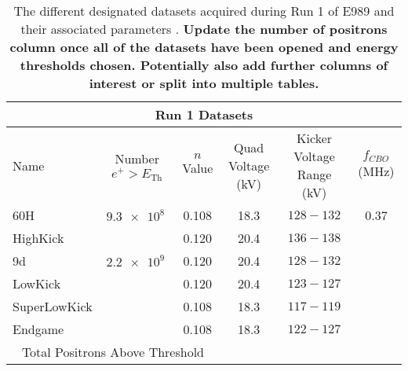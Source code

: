 \begin{landscape}
\begin{table}[]
\centering
\setlength\tabcolsep{10pt}
\renewcommand{\arraystretch}{1.2}
\begin{tabular*}{1\linewidth}{@{\extracolsep{\fill}}lccccc}
  \hline
    \multicolumn{6}{c}{\textbf{Run 1 Datasets}} \\
  \hline\hline
    Name & Number $e^{+} > E_{\text{Th}}$ & $n$ Value & Quad Voltage (kV) & Kicker Voltage Range (kV) & $f_{CBO}$ (MHz) \\
  \hline
    60H & $\SI{9.3e8}{}$ & 0.108 & 18.3 & $128-132$ & 0.37 \\
    HighKick &  & 0.120 & 20.4 & $136-138$ &  \\
    9d & $\SI{2.2e9}{}$ & 0.120 & 20.4 & $128-132$ &  \\
    LowKick &  & 0.120 & 20.4 & $123-127$ &  \\
    SuperLowKick & & 0.108 & 18.3 & $117-119$ &  \\
    Endgame &  & 0.108 & 18.3 & $122-127$ &  \\
  \hline
    \multicolumn{3}{c}{Total Positrons Above Threshold} & \multicolumn{3}{c}{} \\
  \hline
\end{tabular*}
\caption[Run 1 datasets]{The different designated datasets acquired during Run 1 of E989 and their associated parameters \cite{Run1Datasets}. \textbf{Update the number of positrons column once all of the datasets have been opened and energy thresholds chosen. Potentially also add further columns of interest or split into multiple tables.}}
\label{tab:Run1Datasets}
\end{table}
\end{landscape}



\cleardoublepage


